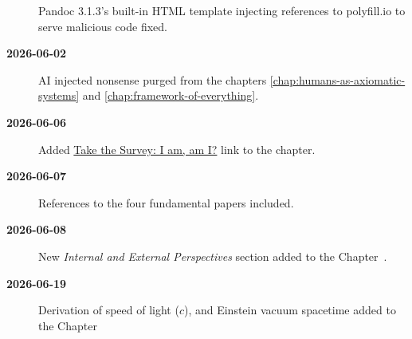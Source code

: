 \begin{description}
  Pandoc 3.1.3’s built-in HTML template injecting references to polyfill.io to serve malicious code fixed.

\item[\textbf{2026-06-02}]
  
  AI injected nonsense purged from the chapters \ref{chap:humans-as-axiomatic-systems} and \ref{chap:framework-of-everything}.
  
\item[\textbf{2026-06-06}]
  
  Added \href{https://meskanen.com/surveys/surveys.html}{Take the Survey: I am, am I?} link to the  chapter.

\item[\textbf{2026-06-07}]
  
  References to the four fundamental papers included.

\item[\textbf{2026-06-08}]
 
  New \textit{Internal and External Perspectives} section added to the Chapter~.

\item[\textbf{2026-06-19}]
 
  Derivation of speed of light ($c$), and Einstein vacuum spacetime
  added to the Chapter~
  


\end{description}


\newpage
